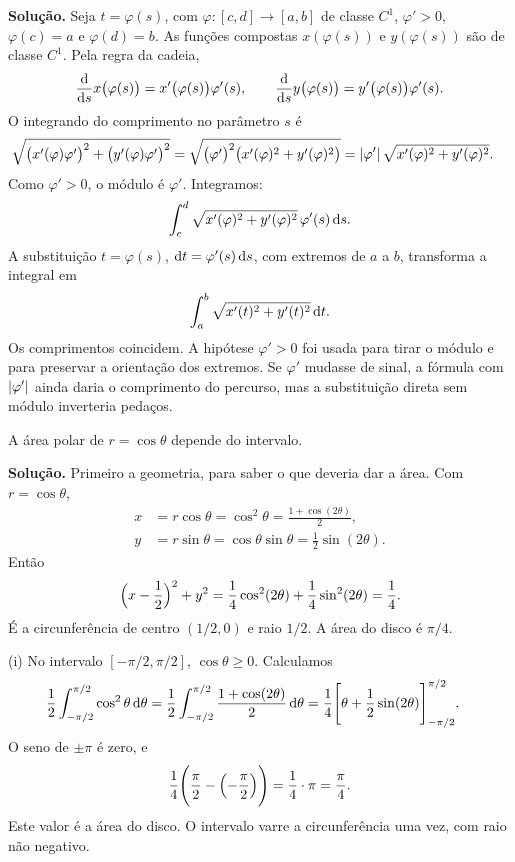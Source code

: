 \documentclass[11pt,a4paper]{article}
\begin{document}
\noindent\textbf{Solução.}
Seja \(t=\varphi(s)\), com \(\varphi:[c,d]\to[a,b]\) de classe \(C^1\), \(\varphi'>0\), \(\varphi(c)=a\) e \(\varphi(d)=b\). As funções compostas \(x(\varphi(s))\) e \(y(\varphi(s))\) são de classe \(C^1\). Pela regra da cadeia,
\[
\frac{\mathrm{d}}{\mathrm{d} s}x\bigl(\varphi(s)\bigr)=x'\bigl(\varphi(s)\bigr)\varphi'(s),
\qquad
\frac{\mathrm{d}}{\mathrm{d} s}y\bigl(\varphi(s)\bigr)=y'\bigl(\varphi(s)\bigr)\varphi'(s).
\]
O integrando do comprimento no parâmetro \(s\) é
\begin{align*}
&\sqrt{\bigl(x'(\varphi)\varphi'\bigr)^{2}+\bigl(y'(\varphi)\varphi'\bigr)^{2}}
=\sqrt{\bigl(\varphi'\bigr)^{2}\bigl(x'(\varphi)^{2}+y'(\varphi)^{2}\bigr)}
=\left\lvert \varphi' \right\rvert\sqrt{x'(\varphi)^{2}+y'(\varphi)^{2}}.
\end{align*}
Como \(\varphi'>0\), o módulo é \(\varphi'\). Integramos:
\begin{align*}
\int_{c}^{d}\sqrt{x'(\varphi)^{2}+y'(\varphi)^{2}}\,\varphi'(s)\,\mathrm{d} s.
\end{align*}
A substituição \(t=\varphi(s)\), \(\mathrm{d} t=\varphi'(s)\,\mathrm{d} s\), com extremos de \(a\) a \(b\), transforma a integral em
\[
\int_{a}^{b}\sqrt{x'(t)^{2}+y'(t)^{2}}\,\mathrm{d} t.
\]
Os comprimentos coincidem. A hipótese \(\varphi'>0\) foi usada para tirar o módulo e para preservar a orientação dos extremos. Se \(\varphi'\) mudasse de sinal, a fórmula com \(\left\lvert \varphi' \right\rvert\) ainda daria o comprimento do percurso, mas a substituição direta sem módulo inverteria pedaços.

\begin{exercicio}[Avançado --- A2]
A área polar de \(r=\cos\theta\) depende do intervalo.
\end{exercicio}

\noindent\textbf{Solução.}
Primeiro a geometria, para saber o que deveria dar a área. Com \(r=\cos\theta\),
\begin{align*}
x&=r\cos\theta=\cos^{2}\theta=\frac{1+\cos(2\theta)}{2},\\
y&=r\sin\theta=\cos\theta\sin\theta=\frac12\sin(2\theta).
\end{align*}
Então
\[
\Bigl(x-\frac12\Bigr)^{2}+y^{2}
=\frac14\cos^{2}(2\theta)+\frac14\sin^{2}(2\theta)
=\frac14.
\]
É a circunferência de centro \((1/2,0)\) e raio \(1/2\). A área do disco é \(\pi/4\).

(i) No intervalo \([-\pi/2,\pi/2]\), \(\cos\theta\ge 0\). Calculamos
\begin{align*}
\frac12\int_{-\pi/2}^{\pi/2}\cos^{2}\theta\,\mathrm{d}\theta
&=\frac12\int_{-\pi/2}^{\pi/2}\frac{1+\cos(2\theta)}{2}\,\mathrm{d}\theta
=\frac14\Biggl[\theta+\frac12\sin(2\theta)\Biggr]_{-\pi/2}^{\pi/2}.
\end{align*}
O seno de \(\pm\pi\) é zero, e
\[
\frac14\Biggl(\frac{\pi}{2}-\Bigl(-\frac{\pi}{2}\Bigr)\Biggr)
=\frac14\cdot\pi
=\frac{\pi}{4}.
\]
Este valor é a área do disco. O intervalo varre a circunferência uma vez, com raio não negativo.
\end{document}
